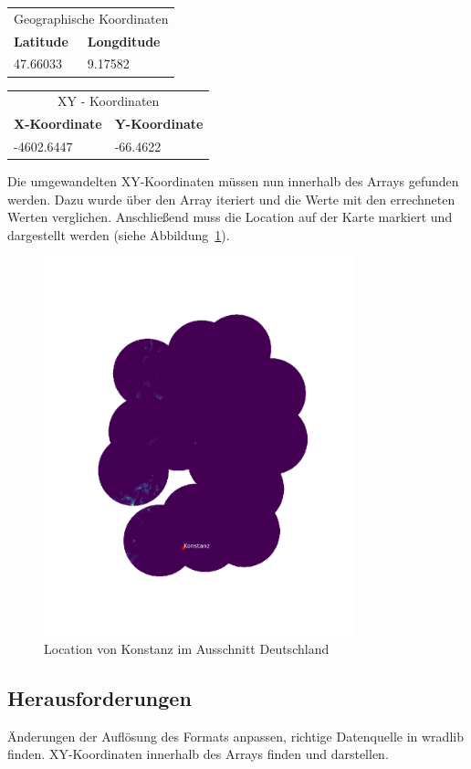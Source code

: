 \begin{table}[H]
\centering
\begin{tabularx}{8cm}{X|X}
\multicolumn{2}{c}{Geographische Koordinaten}\\
\textbf{Latitude} & \textbf{Longditude}\\\hline
47.66033          & 9.17582\\
\end{tabularx} 	
\end{table}

\begin{table}[H]
\centering
\begin{tabularx}{8cm}{X|X}
\multicolumn{2}{c}{XY - Koordinaten}\\
\textbf{X-Koordinate} & \textbf{Y-Koordinate}\\\hline
-4602.6447            & -66.4622\\
\end{tabularx} 	
\end{table}

Die umgewandelten XY-Koordinaten müssen nun innerhalb des Arrays gefunden werden. Dazu wurde über den Array iteriert und die Werte mit den errechneten Werten verglichen. Anschließend muss die Location auf der Karte markiert und dargestellt werden (siehe Abbildung~\ref{fig:location}).

\begin{figure}[H]
	\centering
	\includegraphics[width=0.8\textwidth]{pics/Location.png}
	\caption{Location von Konstanz im Ausschnitt Deutschland}
	\label{fig:location}
\end{figure}

\subsection{Herausforderungen} 
Änderungen der Auflösung des Formats anpassen, richtige Datenquelle in wradlib finden. XY-Koordinaten innerhalb des Arrays finden und darstellen.
